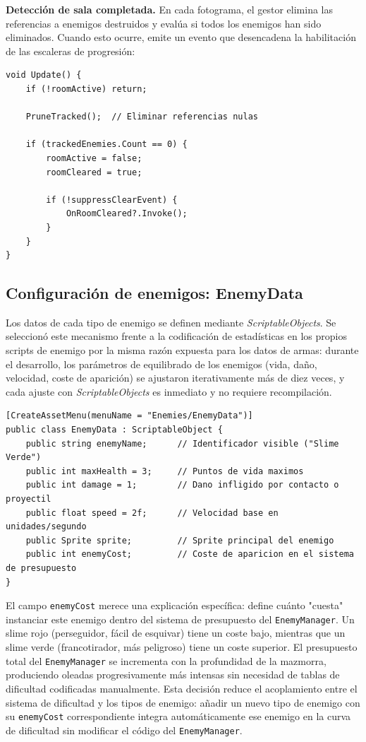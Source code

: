 \textbf{Detección de sala completada.} En cada fotograma, el gestor elimina las referencias a enemigos destruidos y evalúa si todos los enemigos han sido eliminados. Cuando esto ocurre, emite un evento que desencadena la habilitación de las escaleras de progresión:

\begin{lstlisting}
void Update() {
    if (!roomActive) return;
    
    PruneTracked();  // Eliminar referencias nulas
    
    if (trackedEnemies.Count == 0) {
        roomActive = false;
        roomCleared = true;
        
        if (!suppressClearEvent) {
            OnRoomCleared?.Invoke();
        }
    }
}
\end{lstlisting}


\subsection{Configuración de enemigos: EnemyData}


Los datos de cada tipo de enemigo se definen mediante \textit{ScriptableObjects}. Se seleccionó este mecanismo frente a la codificación de estadísticas en los propios scripts de enemigo por la misma razón expuesta para los datos de armas: durante el desarrollo, los parámetros de equilibrado de los enemigos (vida, daño, velocidad, coste de aparición) se ajustaron iterativamente más de diez veces, y cada ajuste con \textit{ScriptableObjects} es inmediato y no requiere recompilación.

\begin{lstlisting}
[CreateAssetMenu(menuName = "Enemies/EnemyData")]
public class EnemyData : ScriptableObject {
    public string enemyName;      // Identificador visible ("Slime Verde")
    public int maxHealth = 3;     // Puntos de vida maximos
    public int damage = 1;        // Dano infligido por contacto o proyectil
    public float speed = 2f;      // Velocidad base en unidades/segundo
    public Sprite sprite;         // Sprite principal del enemigo
    public int enemyCost;         // Coste de aparicion en el sistema de presupuesto
}
\end{lstlisting}


El campo \texttt{enemyCost} merece una explicación específica: define cuánto "cuesta" instanciar este enemigo dentro del sistema de presupuesto del \texttt{EnemyManager}. Un slime rojo (perseguidor, fácil de esquivar) tiene un coste bajo, mientras que un slime verde (francotirador, más peligroso) tiene un coste superior. El presupuesto total del \texttt{EnemyManager} se incrementa con la profundidad de la mazmorra, produciendo oleadas progresivamente más intensas sin necesidad de tablas de dificultad codificadas manualmente. Esta decisión reduce el acoplamiento entre el sistema de dificultad y los tipos de enemigo: añadir un nuevo tipo de enemigo con su \texttt{enemyCost} correspondiente integra automáticamente ese enemigo en la curva de dificultad sin modificar el código del \texttt{EnemyManager}.

